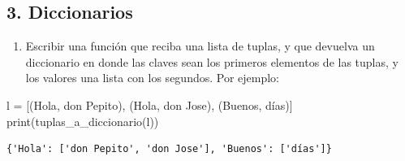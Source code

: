 \documentclass[
  letterpaper,
  DIV=11,
  numbers=noendperiod]{scrreprt}
\newenvironment{Shaded}{\begin{snugshade}}{\end{snugshade}}
\newcommand{\BuiltInTok}[1]{\textcolor[rgb]{0.00,0.23,0.31}{#1}}
\newcommand{\NormalTok}[1]{\textcolor[rgb]{0.00,0.23,0.31}{#1}}
\newcommand{\OperatorTok}[1]{\textcolor[rgb]{0.37,0.37,0.37}{#1}}
\newcommand{\StringTok}[1]{\textcolor[rgb]{0.13,0.47,0.30}{#1}}
\providecommand{\tightlist}{%
  \setlength{\itemsep}{0pt}\setlength{\parskip}{0pt}}\usepackage{longtable,booktabs,array}
\begin{document}
\subsection*{3. Diccionarios}\label{diccionarios-1}

\begin{enumerate}
\def\labelenumi{\arabic{enumi}.}
\tightlist
\item
  Escribir una función que reciba una lista de tuplas, y que devuelva un
  diccionario en donde las claves sean los primeros elementos de las
  tuplas, y los valores una lista con los segundos. Por ejemplo:
\end{enumerate}

\begin{Shaded}
\begin{Highlighting}[]
\NormalTok{l }\OperatorTok{=}\NormalTok{ [(}\StringTok{\textquotesingle{}Hola\textquotesingle{}}\NormalTok{, }\StringTok{\textquotesingle{}don Pepito\textquotesingle{}}\NormalTok{), (}\StringTok{\textquotesingle{}Hola\textquotesingle{}}\NormalTok{, }\StringTok{\textquotesingle{}don Jose\textquotesingle{}}\NormalTok{), (}\StringTok{\textquotesingle{}Buenos\textquotesingle{}}\NormalTok{, }\StringTok{\textquotesingle{}días\textquotesingle{}}\NormalTok{)]}
\BuiltInTok{print}\NormalTok{(tuplas\_a\_diccionario(l))}
\end{Highlighting}
\end{Shaded}

\begin{verbatim}
{'Hola': ['don Pepito', 'don Jose'], 'Buenos': ['días']}
\end{verbatim}
\end{document}

